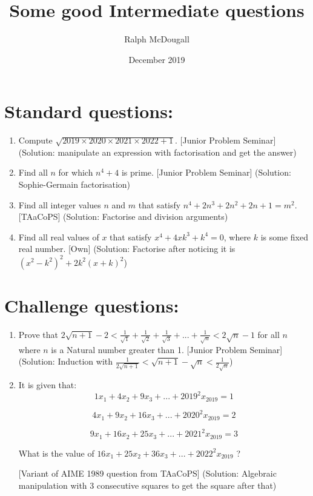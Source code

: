 \documentclass[a4paper,12pt]{article}
\begin{document}
\title {Some good Intermediate questions}
\author{Ralph McDougall}
\date{December 2019}
\maketitle

\section{Standard questions:}

\begin{enumerate}
\item Compute $\sqrt{2019 \times 2020 \times 2021 \times 2022 + 1}$. [Junior Problem Seminar](Solution: manipulate an expression with factorisation and get the answer)

\item Find all $n$ for which $n^4 + 4$ is prime. [Junior Problem Seminar] (Solution: Sophie-Germain factorisation)

\item Find all integer values $n$ and $m$ that satisfy $n^4 + 2n^3 + 2n^2 + 2n + 1 = m^2$. [TAaCoPS] (Solution: Factorise and division arguments) 

\item Find all real values of $x$ that satisfy $x^4 + 4xk^3 + k^4 = 0$, where $k$ is some fixed real number. [Own] (Solution: Factorise after noticing it is $(x^2 - k^2)^2 + 2k^2(x + k)^2$)

\end{enumerate}

\section{Challenge questions:}

\begin{enumerate}
\item Prove that $2\sqrt{n + 1} - 2 < \frac{1}{\sqrt{1}} + \frac{1}{\sqrt{2}} + \frac{1}{\sqrt{3}} + ... + \frac{1}{\sqrt{n}} < 2\sqrt{n} - 1$ for all $n$ where $n$ is a Natural number greater than 1. [Junior Problem Seminar] (Solution: Induction with $\frac{1}{2\sqrt{n + 1}} < \sqrt{n + 1} - \sqrt{n} < \frac{1}{2\sqrt{n}}$)

\item It is given that:
$$1x_1 + 4x_2 + 9x_3 + ... + 2019^2x_{2019} = 1$$

$$4x_1 + 9x_2 + 16x_3 + ... + 2020^2x_{2019} = 2$$

$$9x_1 + 16x_2 + 25x_3 + ... + 2021^2x_{2019} = 3$$

What is the value of $16x_1 + 25x_2 + 36x_3 + ... + 2022^2x_{2019}$ ?

[Variant of AIME 1989 question from TAaCoPS] (Solution: Algebraic manipulation with 3 consecutive squares to get the square after that)

\end{enumerate}
\end{document}
